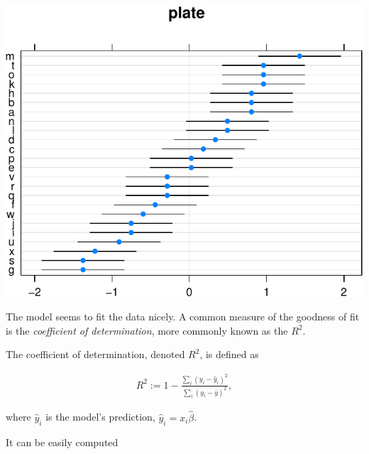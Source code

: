 \documentclass[]{book}
\newenvironment{Shaded}{\begin{snugshade}}{\end{snugshade}}
\newcommand{\KeywordTok}[1]{\textcolor[rgb]{0.13,0.29,0.53}{\textbf{#1}}}
\newcommand{\DataTypeTok}[1]{\textcolor[rgb]{0.13,0.29,0.53}{#1}}
\newcommand{\DecValTok}[1]{\textcolor[rgb]{0.00,0.00,0.81}{#1}}
\newcommand{\StringTok}[1]{\textcolor[rgb]{0.31,0.60,0.02}{#1}}
\newcommand{\ControlFlowTok}[1]{\textcolor[rgb]{0.13,0.29,0.53}{\textbf{#1}}}
\newcommand{\OperatorTok}[1]{\textcolor[rgb]{0.81,0.36,0.00}{\textbf{#1}}}
\newcommand{\NormalTok}[1]{#1}
\theoremstyle{definition}
\theoremstyle{definition}
\theoremstyle{definition}
\theoremstyle{remark}
\let\BeginKnitrBlock\begin \let\EndKnitrBlock\end
\begin{document}
\includegraphics[width=0.5\linewidth]{Rcourse_files/figure-latex/unnamed-chunk-157-1}

The model seems to fit the data nicely. A common measure of the goodness
of fit is the \emph{coefficient of determination}, more commonly known
as the \(R^2\).



\BeginKnitrBlock{definition}[R2]
\protect\hypertarget{def:unnamed-chunk-158}{}{\label{def:unnamed-chunk-158}
{} }The coefficient of determination, denoted \(R^2\),
is defined as

\begin{align}
  R^2:= 1-\frac{\sum_i (y_i - \hat y_i)^2}{\sum_i (y_i - \bar y)^2},
\end{align}

where \(\hat y_i\) is the model's prediction,
\(\hat y_i = x_i \hat \beta\).
\EndKnitrBlock{definition}

It can be easily computed

\begin{Shaded}
\end{Shaded}
\end{document}
